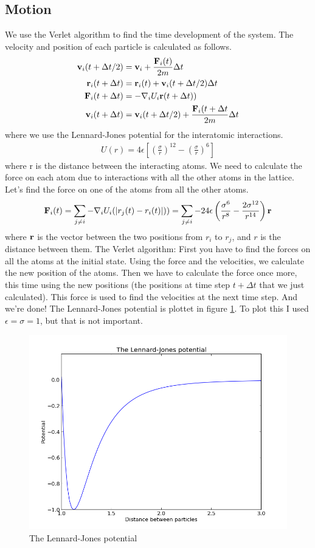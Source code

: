 \subsection{Motion}
We use the Verlet algorithm to find the time development of the system. The velocity and position of each particle is calculated as follows.
\begin{align}
 {\bf v}_i(t + \Delta t/2) &= {\bf v}_i + \frac{{\bf F}_i(t)}{2m}\Delta t\\
 {\bf r}_i(t + \Delta t) &= {\bf r}_i(t) + {\bf v}_i(t + \Delta t/2)\Delta t\\
 {\bf F}_i(t + \Delta t) &= -\nabla_i U_i{\bf r}(t+\Delta t))\\
 {\bf v}_i(t + \Delta t) &= {\bf v}_i(t+ \Delta t/2) + \frac{{\bf F}_i(t+\Delta t}{2m}\Delta t
\end{align}
where we use the Lennard-Jones potential for the interatomic interactions. 
\begin{align}
 U(r) = 4\epsilon\left[ \left(\frac{\sigma}{r}\right)^{12} - \left(\frac{\sigma}{r}\right)^6\right]
\end{align}
where r is the distance between the interacting atoms. We need to calculate the force on each atom due to interactions with all the other atoms in the lattice. Let's find the force on one of the atoms from all the other atoms.
\begin{align}
{\bf F}_i(t) = \sum_{j\neq i} - \nabla_i U_i(|r_j(t)-r_i(t)|)) = \sum_{j\neq i} -24\epsilon \left(\frac{\sigma^6}{r^8} - \frac{2\sigma^{12}}{r^{14}}\right){\bf r} 
\end{align}
where ${\bf r}$ is the vector between the two positions from $r_i$ to $r_j$, and $r$ is the distance between them. The Verlet algorithm: First you have to find the forces on all the atoms at the initial state. Using the force and the velocities, we calculate
the new position of the atoms. Then we have to calculate the force once more, this time using the new positions (the positions at time step $t + \Delta t$ that we just calculated). This force is used to find the velocities at the next time step. And we're done!
The Lennard-Jones potential is plottet in figure \ref{LJ}. To plot this I used $\epsilon = \sigma = 1$, but that is not important. 
\begin{figure}[H]
 \centering
 \includegraphics[width=9 cm]{./figures/Lennard_Jones.png}
 \caption{The Lennard-Jones potential}
 \label{LJ}
\end{figure}

